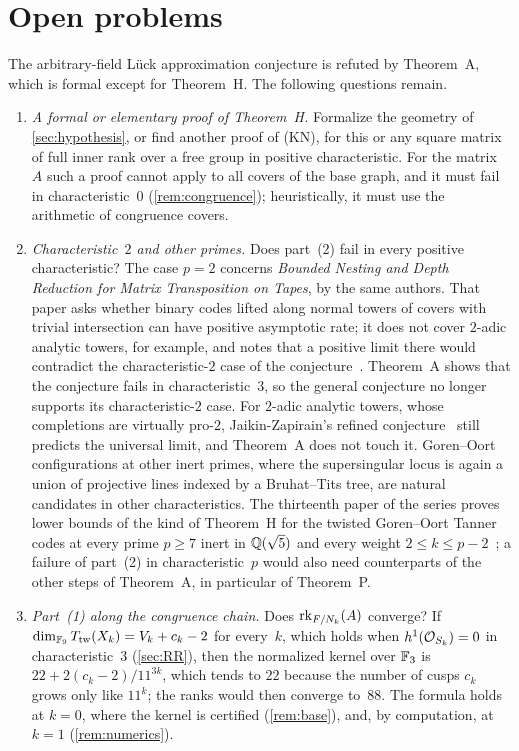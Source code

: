 \section{Open problems}\label{sec:open}

The arbitrary-field L\"uck approximation conjecture is refuted by Theorem~A, which is formal except for Theorem~H. The
following questions remain.

\begin{enumerate}[label=\arabic*.,leftmargin=2em]
\item \emph{A formal or elementary proof of Theorem~H.} Formalize the geometry of \cref{sec:hypothesis}, or find another
proof of (KN), for this or any square matrix of full inner rank over a free group in positive characteristic. For the
matrix~$A$ such a proof cannot apply to all covers of the base graph, and it must fail in characteristic~$0$
(\cref{rem:congruence}); heuristically, it must use the arithmetic of congruence covers.

\item \emph{Characteristic~$2$ and other primes.} Does part~(2) fail in every positive characteristic? The case $p=2$
concerns \emph{Bounded Nesting and Depth Reduction for Matrix Transposition on Tapes}, by the same authors. That paper asks
whether binary codes lifted along normal towers of covers with trivial intersection can have positive asymptotic rate; it
does not cover $2$-adic analytic towers, for example, and notes that a positive limit there would contradict the
characteristic-$2$ case of the conjecture~\cite[Section~8.1]{BoundedNesting2026}. Theorem~A shows that the conjecture
fails in characteristic~$3$, so the general conjecture no longer supports its characteristic-$2$ case. For $2$-adic
analytic towers, whose completions are virtually pro-$2$, Jaikin-Zapirain's refined conjecture~\cite{JaikinBlog2024}
still predicts the universal limit, and Theorem~A does not touch it. Goren--Oort configurations at other inert primes, where the supersingular locus is again a
union of projective lines indexed by a Bruhat--Tits tree, are natural candidates in other characteristics. The
thirteenth paper of the series proves lower bounds of the kind of Theorem~H for the twisted Goren--Oort Tanner codes at
every prime $p\ge7$ inert in $\mathbb{Q}(\sqrt5)$ and every weight $2\le k\le p-2$~\cite[Theorem~G]{StorageCodes2026}; a failure
of part~(2) in characteristic~$p$ would also need counterparts of the other steps of Theorem~A, in particular of
Theorem~P.

\item \emph{Part~(1) along the congruence chain.} Does $\operatorname{rk}_{F/N_k}(A)$ converge? If
$\dim_{\mathbb{F}_9}T_{\mathrm{tw}}(X_k)=V_k+c_k-2$ for every~$k$, which holds when $h^1(\mathcal{O}_{S_k})=0$ in characteristic~$3$
(\cref{sec:RR}), then the normalized kernel over $\mathbb{F}_3$ is $22+2(c_k-2)/11^{3k}$, which tends to $22$ because the number
of cusps $c_k$ grows only like $11^k$; the ranks would then converge to~$88$. The formula holds at $k=0$, where the kernel is certified
(\cref{rem:base}), and, by computation, at $k=1$ (\cref{rem:numerics}).


\end{enumerate}
